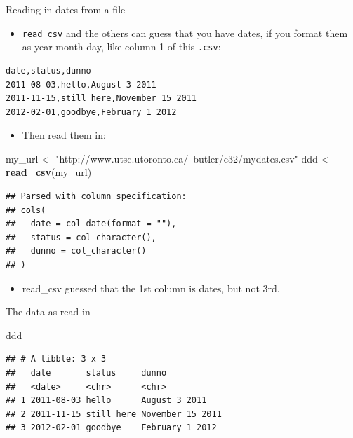 \documentclass[
  ignorenonframetext,
]{beamer}
\newenvironment{Shaded}{\begin{snugshade}}{\end{snugshade}}
\newcommand{\KeywordTok}[1]{\textcolor[rgb]{0.13,0.29,0.53}{\textbf{#1}}}
\newcommand{\NormalTok}[1]{#1}
\newcommand{\StringTok}[1]{\textcolor[rgb]{0.31,0.60,0.02}{#1}}
\providecommand{\tightlist}{%
  \setlength{\itemsep}{0pt}\setlength{\parskip}{0pt}}
\begin{document}
\begin{frame}[fragile]{Reading in dates from a file}
\protect\hypertarget{reading-in-dates-from-a-file}{}

\begin{itemize}
\tightlist
\item
  \texttt{read\_csv} and the others can guess that you have dates, if
  you format them as year-month-day, like column 1 of this
  \texttt{.csv}:
\end{itemize}

\begin{verbatim}
date,status,dunno
2011-08-03,hello,August 3 2011
2011-11-15,still here,November 15 2011
2012-02-01,goodbye,February 1 2012
\end{verbatim}

\begin{itemize}
\tightlist
\item
  Then read them in:
\end{itemize}

\begin{Shaded}
\begin{Highlighting}[]
\NormalTok{my_url <-}\StringTok{ "http://www.utsc.utoronto.ca/~butler/c32/mydates.csv"}
\NormalTok{ddd <-}\StringTok{ }\KeywordTok{read_csv}\NormalTok{(my_url)}
\end{Highlighting}
\end{Shaded}

\begin{verbatim}
## Parsed with column specification:
## cols(
##   date = col_date(format = ""),
##   status = col_character(),
##   dunno = col_character()
## )
\end{verbatim}

\begin{itemize}
\tightlist
\item
  read\_csv guessed that the 1st column is dates, but not 3rd.
\end{itemize}

\end{frame}

\begin{frame}[fragile]{The data as read in}
\protect\hypertarget{the-data-as-read-in}{}

\begin{Shaded}
\begin{Highlighting}[]
\NormalTok{ddd}
\end{Highlighting}
\end{Shaded}

\begin{verbatim}
## # A tibble: 3 x 3
##   date       status     dunno           
##   <date>     <chr>      <chr>           
## 1 2011-08-03 hello      August 3 2011   
## 2 2011-11-15 still here November 15 2011
## 3 2012-02-01 goodbye    February 1 2012
\end{verbatim}

\end{frame}
\end{document}

